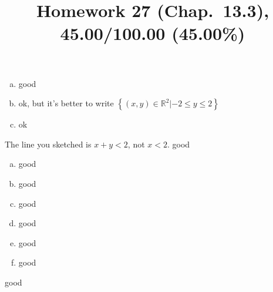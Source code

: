\documentclass[10pt]{article} %
\title{Homework 27 (Chap.~13.3),
45.00/100.00 (45.00\%)
}
\begin{document}
\maketitle
{}
\begin{enumerate}[(a)]
	\item good
	\item ok, but it's better to write $\left\{ (x,y)\in\mathbb{R}^2\left|-2\le y \le 2 \right. \right\}$
	\item ok
\end{enumerate}
The line you sketched is $x+y<2$, not $x<2$.
good
\begin{enumerate}[(a)]
	\item good
	\item good
	\item good
	\item good
	\item good
	\item good
\end{enumerate}
good
\end{document}
